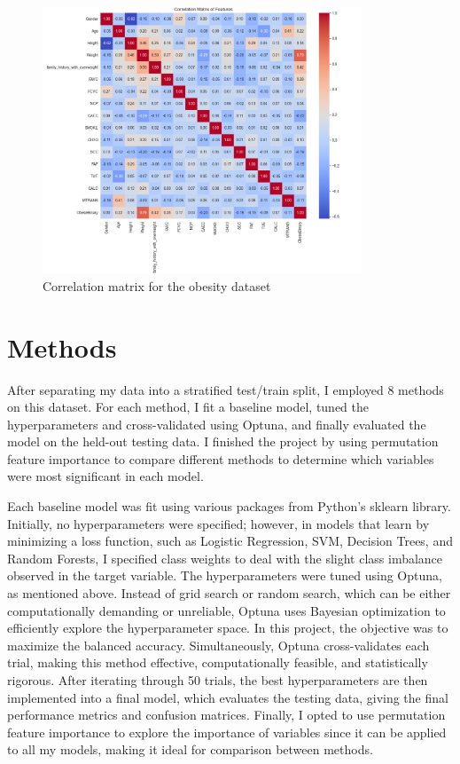\documentclass[a4paper,12pt]{article}
\begin{document}
\begin{figure}[H]
    \centering
    \includegraphics[width=0.85\textwidth]{CorrelationHeat.png}
    \caption{Correlation matrix for the obesity dataset}
    \label{fig:correlation_matrix}
\end{figure}

\section{Methods}
After separating my data into a stratified test/train split, I employed 8 methods on this dataset. For each method, I fit a baseline model, tuned the hyperparameters and cross-validated using Optuna, and finally evaluated the model on the held-out testing data. I finished the project by using permutation feature importance to compare different methods to determine which variables were most significant in each model. 

Each baseline model was fit using various packages from Python's sklearn library. Initially, no hyperparameters were specified; however, in models that learn by minimizing a loss function, such as Logistic Regression, SVM, Decision Trees, and Random Forests, I specified class weights to deal with the slight class imbalance observed in the target variable. The hyperparameters were tuned using Optuna, as mentioned above. Instead of grid search or random search, which can be either computationally demanding or unreliable, Optuna uses Bayesian optimization to efficiently explore the hyperparameter space. In this project, the objective was to maximize the balanced accuracy. Simultaneously, Optuna cross-validates each trial, making this method effective, computationally feasible, and statistically rigorous. After iterating through 50 trials, the best hyperparameters are then implemented into a final model, which evaluates the testing data, giving the final performance metrics and confusion matrices. Finally, I opted to use permutation feature importance to explore the importance of variables since it can be applied to all my models, making it ideal for comparison between methods.
\end{document}

